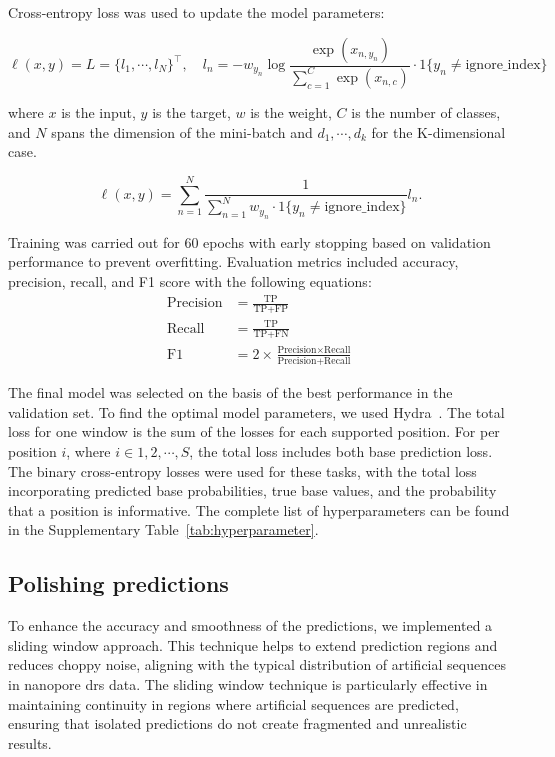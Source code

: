\documentclass[pdflatex, sn-mathphys-num, lineno]{sn-jnl}%
\theoremstyle{thmstyleone}%
\theoremstyle{thmstyletwo}%
\theoremstyle{thmstylethree}%
\begin{document}
Cross-entropy loss was used to update the model parameters:

\[
	\ell(x, y) = L = \{l_1,\cdots,l_N\}^\top, \quad
	l_n = - w_{y_n} \log \frac{\exp(x_{n,y_n})}{\sum_{c=1}^C \exp(x_{n,c})}
	\cdot 1\{y_n \not= \textrm{ignore\_index}\}
\]

where \( x \) is the input, \( y \) is the target, \( w \) is the weight,
\( C \) is the number of classes, and \( N \) spans the dimension of the mini-batch and
\( d_1, \cdots, d_k \) for the K-dimensional case.

\[
	\ell(x, y) =   \sum_{n=1}^N \frac{1}{\sum_{n=1}^N w_{y_n} \cdot 1\{y_n \not= \textrm{ignore\_index}\}} l_n
	.\]

Training was carried out for \num{60} epochs with early stopping based on validation performance to prevent overfitting.
Evaluation metrics included accuracy, precision, recall, and F1 score with the following equations:
\begin{align*}
	\textrm{Precision} & = \frac{\textrm{TP}}{\textrm{TP}+\textrm{FP}}                                                     \\
	\textrm{Recall}    & = \frac{\textrm{TP}}{\textrm{TP}+\textrm{FN}}                                                     \\
	\textrm{F1}        & = 2 \times \frac{\textrm{Precision} \times \textrm{Recall}}{\textrm{Precision} + \textrm{Recall}}
\end{align*}

The final model was selected on the basis of the best performance in the validation set.
To find the optimal model parameters, we used Hydra~\cite{Yadan2019Hydra}.
The total loss for one window is the sum of the losses for each supported position.
For per position \( i \), where \( i  \in {1, 2, \cdots, S} \),  the total loss includes both base prediction loss.
The binary cross-entropy losses were used for these tasks, with the total loss incorporating predicted base probabilities, true base values, and the probability that a position is informative.
The complete list of hyperparameters can be found in the Supplementary Table~\ref{tab:hyperparameter}.

\subsection{Polishing predictions}

To enhance the accuracy and smoothness of the predictions, we implemented a sliding window approach.
This technique helps to extend prediction regions and reduces choppy noise, aligning with the typical distribution of artificial sequences in nanopore \gls{drs} data.
The sliding window technique is particularly effective in maintaining continuity in regions where artificial sequences are predicted, ensuring that isolated predictions do not create fragmented and unrealistic results.
\end{document}
